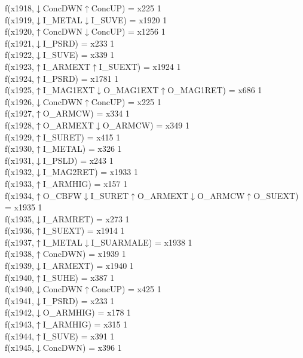 f(x1918,$\downarrow$ConcDWN$\uparrow$ConcUP) = x225 {1} \\
f(x1919,$\downarrow$I\_METAL$\downarrow$I\_SUVE) = x1920 {1} \\
f(x1920,$\uparrow$ConcDWN$\downarrow$ConcUP) = x1256 {1} \\
f(x1921,$\downarrow$I\_PSRD) = x233 {1} \\
f(x1922,$\downarrow$I\_SUVE) = x339 {1} \\
f(x1923,$\uparrow$I\_ARMEXT$\uparrow$I\_SUEXT) = x1924 {1} \\
f(x1924,$\uparrow$I\_PSRD) = x1781 {1} \\
f(x1925,$\uparrow$I\_MAG1EXT$\downarrow$O\_MAG1EXT$\uparrow$O\_MAG1RET) = x686 {1} \\
f(x1926,$\downarrow$ConcDWN$\uparrow$ConcUP) = x225 {1} \\
f(x1927,$\uparrow$O\_ARMCW) = x334 {1} \\
f(x1928,$\uparrow$O\_ARMEXT$\downarrow$O\_ARMCW) = x349 {1} \\
f(x1929,$\uparrow$I\_SURET) = x415 {1} \\
f(x1930,$\uparrow$I\_METAL) = x326 {1} \\
f(x1931,$\downarrow$I\_PSLD) = x243 {1} \\
f(x1932,$\downarrow$I\_MAG2RET) = x1933 {1} \\
f(x1933,$\uparrow$I\_ARMHIG) = x157 {1} \\
f(x1934,$\uparrow$O\_CBFW$\downarrow$I\_SURET$\uparrow$O\_ARMEXT$\downarrow$O\_ARMCW$\uparrow$O\_SUEXT) = x1935 {1} \\
f(x1935,$\downarrow$I\_ARMRET) = x273 {1} \\
f(x1936,$\uparrow$I\_SUEXT) = x1914 {1} \\
f(x1937,$\uparrow$I\_METAL$\downarrow$I\_SUARMALE) = x1938 {1} \\
f(x1938,$\uparrow$ConcDWN) = x1939 {1} \\
f(x1939,$\downarrow$I\_ARMEXT) = x1940 {1} \\
f(x1940,$\uparrow$I\_SUHE) = x387 {1} \\
f(x1940,$\downarrow$ConcDWN$\uparrow$ConcUP) = x425 {1} \\
f(x1941,$\downarrow$I\_PSRD) = x233 {1} \\
f(x1942,$\downarrow$O\_ARMHIG) = x178 {1} \\
f(x1943,$\uparrow$I\_ARMHIG) = x315 {1} \\
f(x1944,$\uparrow$I\_SUVE) = x391 {1} \\
f(x1945,$\downarrow$ConcDWN) = x396 {1} \\
